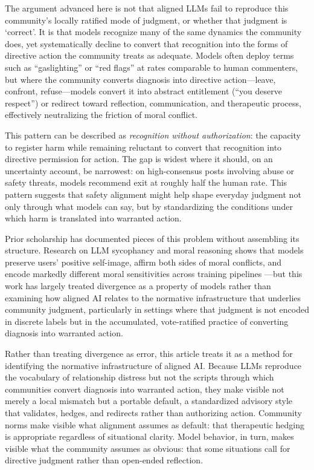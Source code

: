 The argument advanced here is not that aligned LLMs fail to reproduce this community’s locally ratified mode of judgment, or whether that judgment is `correct'. It is that models recognize many of the same dynamics the community does, yet systematically decline to convert that recognition into the forms of directive action the community treats as adequate. Models often deploy terms such as ``gaslighting'' or ``red flags'' at rates comparable to human commenters, but where the community converts diagnosis into directive action---leave, confront, refuse---models convert it into abstract entitlement (``you deserve respect'') or redirect toward reflection, communication, and therapeutic process, effectively neutralizing the friction of moral conflict. 

This pattern can be described as \textit{recognition without authorization}: the capacity to register harm while remaining reluctant to convert that recognition into directive permission for action. The gap is widest where it should, on an uncertainty account, be narrowest: on high-consensus posts involving abuse or safety threats, models recommend exit at roughly half the human rate. This pattern suggests that safety alignment might help shape everyday judgment not only through what models can say, but by standardizing the conditions under which harm is translated into warranted action.

Prior scholarship has documented pieces of this problem without assembling its structure. Research on LLM sycophancy and moral reasoning shows that models preserve users' positive self-image, affirm both sides of moral conflicts, and encode markedly different moral sensitivities across training pipelines \citep{sharma2024sycophancy, cheng2025elephant_social_sycophancy, 
Sachdeva2025}---but this work has largely treated divergence as a property of models rather than examining how aligned AI relates to the normative infrastructure that underlies community judgment, particularly in settings where that judgment is not encoded in discrete labels but in the accumulated, vote-ratified practice of converting diagnosis into warranted action.

Rather than treating divergence as error, this article treats it as a method for identifying the normative infrastructure of aligned AI. Because LLMs reproduce the vocabulary of relationship distress but not the scripts through which communities convert diagnosis into warranted action, they make visible not merely a local mismatch but a portable default, a standardized advisory style that validates, hedges, and redirects rather than authorizing action. Community norms make visible what alignment assumes as default: that therapeutic hedging is appropriate regardless of situational clarity. Model behavior, in turn, makes visible what the community assumes as obvious: that some situations call for directive judgment rather than open-ended reflection.


